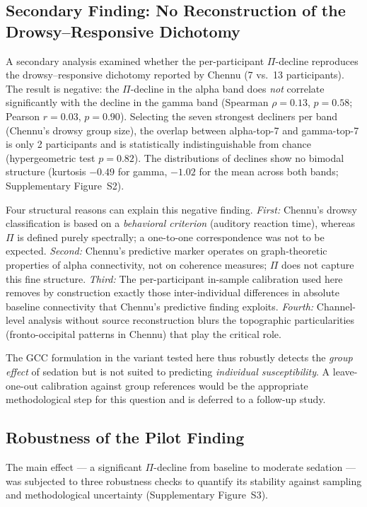 ﻿\documentclass[11pt,a4paper]{article}
\theoremstyle{plain}
\theoremstyle{definition}
\theoremstyle{remark}
\begin{document}
\subsection{Secondary Finding: No Reconstruction of the Drowsy--Responsive Dichotomy}

A secondary analysis examined whether the per-participant $\Pi$-decline reproduces the drowsy--responsive dichotomy reported by Chennu (7 vs.~13 participants). The result is negative: the $\Pi$-decline in the alpha band does \emph{not} correlate significantly with the decline in the gamma band (Spearman $\rho = 0.13$, $p = 0.58$; Pearson $r = 0.03$, $p = 0.90$). Selecting the seven strongest decliners per band (Chennu's drowsy group size), the overlap between alpha-top-7 and gamma-top-7 is only 2 participants and is statistically indistinguishable from chance (hypergeometric test $p = 0.82$). The distributions of declines show no bimodal structure (kurtosis $-0.49$ for gamma, $-1.02$ for the mean across both bands; Supplementary Figure~S2).

Four structural reasons can explain this negative finding. \emph{First:} Chennu's drowsy classification is based on a \emph{behavioral criterion} (auditory reaction time), whereas $\Pi$ is defined purely spectrally; a one-to-one correspondence was not to be expected. \emph{Second:} Chennu's predictive marker operates on graph-theoretic properties of alpha connectivity, not on coherence measures; $\Pi$ does not capture this fine structure. \emph{Third:} The per-participant in-sample calibration used here removes by construction exactly those inter-individual differences in absolute baseline connectivity that Chennu's predictive finding exploits. \emph{Fourth:} Channel-level analysis without source reconstruction blurs the topographic particularities (fronto-occipital patterns in Chennu) that play the critical role.

The GCC formulation in the variant tested here thus robustly detects the \emph{group effect} of sedation but is not suited to predicting \emph{individual susceptibility}. A leave-one-out calibration against group references would be the appropriate methodological step for this question and is deferred to a follow-up study.

\subsection{Robustness of the Pilot Finding}

The main effect --- a significant $\Pi$-decline from baseline to moderate sedation --- was subjected to three robustness checks to quantify its stability against sampling and methodological uncertainty (Supplementary Figure~S3).
\end{document}
